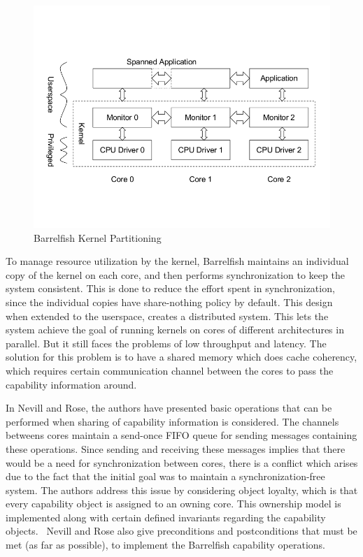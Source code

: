 \begin{figure}[h]
 \centering
\includegraphics[scale=0.25]{img/BF_sharing_res}
\caption{Barrelfish Kernel Partitioning}
\label{kernelpartition}
\end{figure}
To manage resource utilization by the kernel, Barrelfish maintains an individual copy of the kernel on each core, and then performs synchronization to keep the system consistent. This is done to reduce the effort spent in synchronization, since the individual  copies have share-nothing policy by default. This design when extended to the userspace, creates a distributed system. This lets the system achieve the goal of running kernels on cores of different architectures in parallel. But it still faces the problems of low throughput and latency. The solution for this problem is to have a shared memory which does cache coherency, which requires certain communication channel between the cores to pass the capability information around. 

In Nevill and Rose, the authors have presented basic operations that can be performed when sharing of capability information is considered. The channels betweens cores maintain a send-once FIFO queue for sending messages containing these operations. Since sending and receiving these messages implies that there would be a need for synchronization between cores, there is a conflict which arises due to the fact that the initial goal was to maintain a synchronization-free system. The authors address this issue by considering object loyalty, which is that every capability object is assigned to an owning core. This ownership model is implemented along with certain defined invariants regarding the capability objects.~\cite{nevillmasters} Nevill and Rose also give preconditions and postconditions that must be met (as far as possible), to implement the Barrelfish capability operations.

